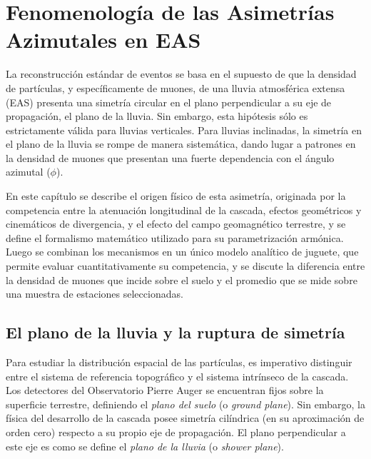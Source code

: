 
\section{Fenomenología de las Asimetrías Azimutales en EAS}
\label{sec:fenomenologia}

La reconstrucción estándar de eventos se basa en el supuesto de que la densidad de partículas, y específicamente de muones, de una lluvia atmosférica extensa (EAS) presenta una simetría circular en el plano perpendicular a su eje de propagación, el plano de la lluvia. Sin embargo, esta hipótesis sólo es estrictamente válida para lluvias verticales. Para lluvias inclinadas, la simetría en el plano de la lluvia se rompe de manera sistemática, dando lugar a patrones en la densidad de muones que presentan una fuerte dependencia con el ángulo azimutal ($\phi$).

En este capítulo se describe el origen físico de esta asimetría, originada por la competencia entre la atenuación longitudinal de la cascada, efectos geométricos y cinemáticos de divergencia, y el efecto del campo geomagnético terrestre, y se define el formalismo matemático utilizado para su parametrización armónica. Luego se combinan los mecanismos en un único modelo analítico de juguete, que permite evaluar cuantitativamente su competencia, y se discute la diferencia entre la densidad de muones que incide sobre el suelo y el promedio que se mide sobre una muestra de estaciones seleccionadas.

\subsection{El plano de la lluvia y la ruptura de simetría}
\label{subsec:simetria_ruptura}

Para estudiar la distribución espacial de las partículas, es imperativo distinguir entre el sistema de referencia topográfico y el sistema intrínseco de la cascada. Los detectores del Observatorio Pierre Auger se encuentran fijos sobre la superficie terrestre, definiendo el \textit{plano del suelo} (o \textit{ground plane}). Sin embargo, la física del desarrollo de la cascada posee simetría cilíndrica (en su aproximación de orden cero) respecto a su propio eje de propagación. El plano perpendicular a este eje es como se define el \textit{plano de la lluvia} (o \textit{shower plane}).

